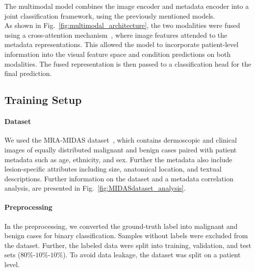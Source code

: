 \documentclass{article}
\begin{document}
	The multimodal model combines the image encoder and metadata encoder into a joint classification framework, using the previously mentioned models.\\	
	As shown in Fig.~\ref{fig:multimodal_architecture}, the two modalities were fused using a cross-attention mechanism~\citep{cai2022multimodal}, where image features attended to the metadata representations. This allowed the model to incorporate patient-level information into the visual feature space and condition predictions on both modalities. The fused representation is then passed to a classification head for the final prediction. %
	
	
	
	\subsection{Training Setup}
	\paragraph{Dataset} 
	We used the MRA-MIDAS dataset~\citep{midas2023}, which contains dermoscopic and clinical images of equally distributed malignant and benign cases paired with patient metadata such as age, ethnicity, and sex. Further the metadata also include lesion-specific attributes including size, anatomical location, and textual descriptions. Further information on the dataset and a metadata correlation analysis, are presented in Fig.~\ref{fig:MIDASdataset_analysis}.  
	
	\paragraph{Preprocessing}
	In the preprocessing, we converted the ground-truth label into malignant and benign cases for binary classification. Samples without labels were excluded from the dataset. Further, the labeled data were split into training, validation, and test sets ($80\%$-$10\%$-$10\%$). To avoid data leakage, the dataset was split on a patient level.
	
\end{document}
